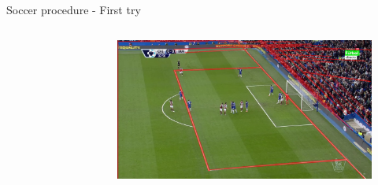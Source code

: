 \documentclass[12pt]{beamer}
\begin{document}
\begin{frame}{Soccer procedure - First try}
\begin{columns}
{\begin{figure}
        \end{figure}
        \vspace{-1em}
        \begin{figure}
            \includegraphics[width=\textwidth]{resources/png/soccer_00020_04_bad.png}
        \end{figure}
    }
    \end{columns}
\end{frame}
\end{document}
